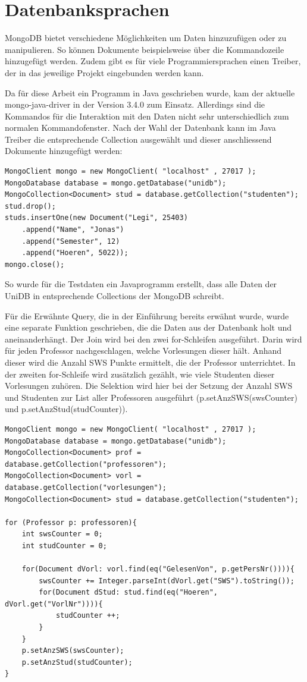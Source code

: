 \section{Datenbanksprachen}
 
MongoDB bietet verschiedene Möglichkeiten um Daten hinzuzufügen oder zu manipulieren. So können Dokumente beispielsweise über die Kommandozeile hinzugefügt werden. Zudem gibt es für viele Programmiersprachen einen Treiber, der in das jeweilige Projekt eingebunden werden kann. 
 
Da für diese Arbeit ein Programm in Java geschrieben wurde, kam der aktuelle mongo-java-driver in der Version 3.4.0 zum Einsatz. Allerdings sind die Kommandos für die Interaktion mit den Daten nicht sehr unterschiedlich zum normalen Kommandofenster. Nach der Wahl der Datenbank kann im Java Treiber  die entsprechende Collection ausgewählt und dieser anschliessend Dokumente hinzugefügt werden:
 
\begin{lstlisting}[basicstyle=\scriptsize]
MongoClient mongo = new MongoClient( "localhost" , 27017 );
MongoDatabase database = mongo.getDatabase("unidb");
MongoCollection<Document> stud = database.getCollection("studenten");
stud.drop();
studs.insertOne(new Document("Legi", 25403)
	.append("Name", "Jonas")
	.append("Semester", 12)
	.append("Hoeren", 5022));
mongo.close();
\end{lstlisting}

So wurde für die Testdaten ein Javaprogramm erstellt, dass alle Daten der UniDB in entsprechende Collections der MongoDB schreibt.

Für die Erwähnte Query, die in der Einführung bereits erwähnt wurde, wurde eine separate Funktion geschrieben, die die Daten aus der Datenbank holt und aneinanderhängt. Der Join wird bei den zwei for-Schleifen ausgeführt. Darin wird für jeden Professor nachgeschlagen, welche Vorlesungen dieser hält. Anhand dieser wird die Anzahl SWS Punkte ermittelt, die der Professor unterrichtet. In der zweiten for-Schleife wird zusätzlich gezählt, wie viele Studenten dieser Vorlesungen zuhören. Die Selektion wird hier bei der Setzung der Anzahl SWS und Studenten zur List aller Professoren ausgeführt (p.setAnzSWS(swsCounter) und p.setAnzStud(studCounter)). 

\begin{lstlisting}[basicstyle=\scriptsize]
MongoClient mongo = new MongoClient( "localhost" , 27017 );
MongoDatabase database = mongo.getDatabase("unidb");
MongoCollection<Document> prof = database.getCollection("professoren");
MongoCollection<Document> vorl = database.getCollection("vorlesungen");
MongoCollection<Document> stud = database.getCollection("studenten");

for (Professor p: professoren){
	int swsCounter = 0;
	int studCounter = 0;
	
	for(Document dVorl: vorl.find(eq("GelesenVon", p.getPersNr()))){
		swsCounter += Integer.parseInt(dVorl.get("SWS").toString());
		for(Document dStud: stud.find(eq("Hoeren", dVorl.get("VorlNr")))){
			studCounter ++;
		}
	}
	p.setAnzSWS(swsCounter);
	p.setAnzStud(studCounter);
}
\end{lstlisting}
 
